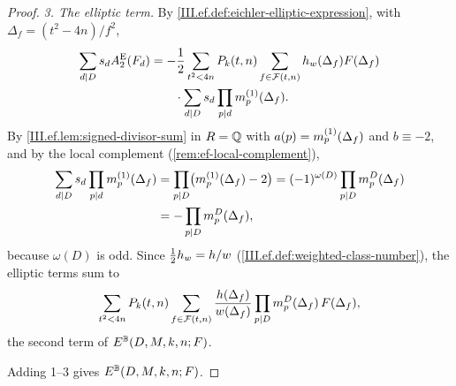 \begin{proof}
\emph{3. The elliptic term.} By \cref{III.ef.def:eichler-elliptic-expression}, with $\Delta_f=(t^2-4n)/f^2$,
\[
\begin{aligned}
  \sum_{d\mid D}s_dA_2^{\mathrm E}(F_d)&=-\frac12\sum_{t^2<4n}P_k(t,n)\sum_{f\in\mathcal{F}(t,n)}h_w(\Delta_f)F(\Delta_f)\\
  &\qquad\cdot\sum_{d\mid D}s_d\prod_{p\mid d}m^{(1)}_p(\Delta_f).
\end{aligned}
\]
By \cref{III.ef.lem:signed-divisor-sum} in $R=\mathbb{Q}$ with $a(p)=m^{(1)}_p(\Delta_f)$ and $b\equiv-2$, and by the local complement
(\cref{rem:ef-local-complement}),
\[
\begin{aligned}
  \sum_{d\mid D}s_d\prod_{p\mid d}m^{(1)}_p(\Delta_f)&=\prod_{p\mid D}\bigl(m^{(1)}_p(\Delta_f)-2\bigr)=(-1)^{\omega(D)}\prod_{p\mid D}m^{D}_p(\Delta_f)\\
  &=-\prod_{p\mid D}m^{D}_p(\Delta_f),
\end{aligned}
\]
because $\omega(D)$ is odd. Since $\frac12h_w=h/w$ (\cref{III.ef.def:weighted-class-number}), the elliptic terms sum to
\[
  \sum_{t^2<4n}P_k(t,n)\sum_{f\in\mathcal{F}(t,n)}\frac{h(\Delta_f)}{w(\Delta_f)}\prod_{p\mid D}m^{D}_p(\Delta_f)\,F(\Delta_f),
\]
the second term of $E^{\mathbb{B}}(D,M,k,n;F)$.

Adding 1--3 gives $E^{\mathbb{B}}(D,M,k,n;F)$.
\end{proof}

